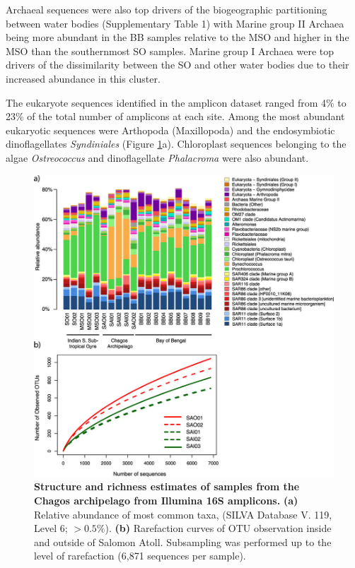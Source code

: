 Archaeal sequences were also top drivers of the biogeographic partitioning between water bodies (Supplementary Table 1) with Marine group II Archaea being more abundant in the BB samples relative to the MSO and higher in the MSO than the southernmost SO samples. Marine group I Archaea were top drivers of the dissimilarity between the SO and other water bodies due to their increased abundance in this cluster.

The eukaryote sequences identified in the amplicon dataset ranged from 4\% to 23\% of the total number of amplicons at each site. Among the most abundant eukaryotic sequences were Arthopoda (Maxillopoda) and the endosymbiotic dinoflagellates {\em Syndiniales} (Figure \ref{Chagos_fig3}a). Chloroplast sequences belonging to the algae {\em Ostreococcus} and dinoflagellate {\em Phalacroma} were also abundant.

\begin{figure}
    \centering
    \includegraphics[width=\textwidth]{Chagos/figures/fig3}
    \caption{\textbf{Structure and richness estimates of samples from the Chagos archipelago from Illumina 16S amplicons.} \textbf{(a)} Relative abundance of most common taxa, (SILVA Database V. 119, Level 6; $>0.5\%$). \textbf{(b)} Rarefaction curves of OTU observation inside and outside of Salomon Atoll. Subsampling was performed up to the level of rarefaction (6,871 sequences per sample).}
    \label{Chagos_fig3}
\end{figure}

